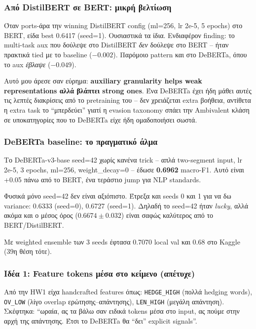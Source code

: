 \documentclass[12pt]{fphw}
\begin{document}
\subsubsection{Από DistilBERT σε BERT: μικρή βελτίωση}

Όταν ports-άρα την winning DistilBERT config (ml=256, lr 2e-5, 5 epochs) στο BERT, είδα best 0.6417 (seed=1). Ουσιαστικά τα ίδια. Ενδιαφέρον finding: το multi-task aux που δούλεψε στο DistilBERT \emph{δεν} δούλεψε στο BERT -- ήταν πρακτικά tied με το baseline ($-0.002$). Παρόμοιο pattern και στο DeBERTa, όπου το aux \emph{έβλαψε} ($-0.049$).

Αυτό μου άρεσε σαν εύρημα: \textbf{auxiliary granularity helps weak representations αλλά βλάπτει strong ones}. Ένα DeBERTa έχει ήδη μάθει αυτές τις λεπτές διακρίσεις από το pretraining του -- δεν χρειάζεται extra βοήθεια, αντίθετα η extra task το ``μπερδεύει'' γιατί η evasion taxonomy σπάει την Ambivalent κλάση σε υποκατηγορίες που το DeBERTa είχε ήδη ομαδοποιήσει σωστά.

\subsubsection{DeBERTa baseline: το πραγματικό άλμα}

Το DeBERTa-v3-base seed=42 χωρίς κανένα trick -- απλά two-segment input, lr 2e-5, 3 epochs, ml=256, weight\_decay=0 -- έδωσε \textbf{0.6962} macro-F1. Αυτό είναι +0.05 πάνω από το BERT, ένα τεράστιο jump για NLP standards.

Φυσικά μόνο seed=42 δεν είναι αξιόπιστο. Έτρεξα και seeds 0 και 1 για να δω variance: 0.6333 (seed=0), 0.6727 (seed=1). Δηλαδή το seed=42 ήταν \textit{lucky}, αλλά ακόμα και ο μέσος όρος ($0.6674 \pm 0.032$) είναι σαφώς καλύτερος από το BERT/DistilBERT.

Με weighted ensemble των 3 seeds έφτασα 0.7070 local val και 0.68 στο Kaggle (39η θέση τότε).

\subsubsection{Ιδέα 1: Feature tokens μέσα στο κείμενο (απέτυχε)}

Από την HW1 είχα handcrafted features όπως: \texttt{HEDGE\_HIGH} (πολλά hedging words), \texttt{OV\_LOW} (λίγο overlap ερώτησης--απάντησης), \texttt{LEN\_HIGH} (μεγάλη απάντηση). Σκέφτηκα: ``ωραία, ας τα βάλω σαν ειδικά tokens μέσα στο input, ας πούμε στην αρχή της απάντησης. Έτσι το DeBERTa θα ``δει'' explicit signals''.
\end{document}
